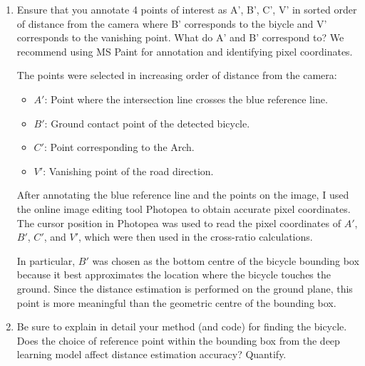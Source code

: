 \begin{enumerate}
\item Ensure that you annotate 4 points of interest as A', B', C', V'  in sorted order of distance from the camera where B' corresponds to the biycle and V' corresponds to the vanishing point.  What do A' and B' correspond to?
We recommend using MS Paint for annotation and identifying pixel coordinates.
\begin{studentSpace}

The points were selected in increasing order of distance from the camera:

\begin{itemize}
\item \(A'\): Point where the intersection line crosses the blue reference line.
\item \(B'\): Ground contact point of the detected bicycle.
\item \(C'\): Point corresponding to the Arch.
\item \(V'\): Vanishing point of the road direction.
\end{itemize}

After annotating the blue reference line and the points on the image, I used the online image editing tool Photopea to obtain accurate pixel coordinates. The cursor position in Photopea was used to read the pixel coordinates of \(A'\), \(B'\), \(C'\), and \(V'\), which were then used in the cross-ratio calculations.

In particular, \(B'\) was chosen as the bottom centre of the bicycle bounding box because it best approximates the location where the bicycle touches the ground. Since the distance estimation is performed on the ground plane, this point is more meaningful than the geometric centre of the bounding box.
\end{studentSpace}

\item Be sure to  explain in detail your method (and code) for finding the bicycle. Does the choice of reference point within the bounding box from the deep learning model affect distance estimation accuracy? Quantify.
\end{enumerate}
